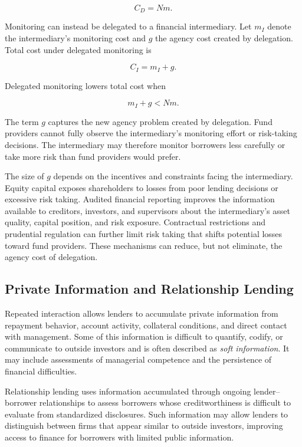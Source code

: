\begin{equation}
C_D=Nm.
\label{eq:ch4-direct-monitoring}
\end{equation}

Monitoring can instead be delegated to a financial intermediary. Let $m_I$ denote the intermediary's monitoring cost and $g$ the agency cost created by delegation. Total cost under delegated monitoring is

\begin{equation}
C_I=m_I+g.
\label{eq:ch4-delegated-monitoring}
\end{equation}

Delegated monitoring lowers total cost when

\begin{equation}
m_I+g<Nm.
\label{eq:ch4-delegation-condition}
\end{equation}

The term $g$ captures the new agency problem created by delegation. Fund providers cannot fully observe the intermediary's monitoring effort or risk-taking decisions. The intermediary may therefore monitor borrowers less carefully or take more risk than fund providers would prefer.

The size of $g$ depends on the incentives and constraints facing the intermediary. Equity capital exposes shareholders to losses from poor lending decisions or excessive risk taking. Audited financial reporting improves the information available to creditors, investors, and supervisors about the intermediary's asset quality, capital position, and risk exposure. Contractual restrictions and prudential regulation can further limit risk taking that shifts potential losses toward fund providers. These mechanisms can reduce, but not eliminate, the agency cost of delegation.

\subsection{Private Information and Relationship Lending}

Repeated interaction allows lenders to accumulate private information from repayment behavior, account activity, collateral conditions, and direct contact with management. Some of this information is difficult to quantify, codify, or communicate to outside investors and is often described as \emph{soft information}. It may include assessments of managerial competence and the persistence of financial difficulties.

Relationship lending uses information accumulated through ongoing lender–borrower relationships to assess borrowers whose creditworthiness is difficult to evaluate from standardized disclosures. Such information may allow lenders to distinguish between firms that appear similar to outside investors, improving access to finance for borrowers with limited public information.

